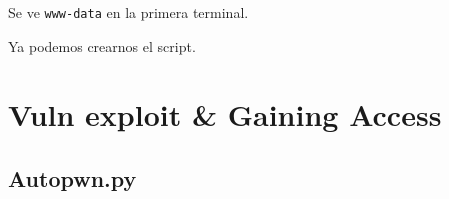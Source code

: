 \documentclass{assets/ipesethesis}
\begin{document}
Se ve \texttt{www-data} en la primera terminal.

Ya podemos crearnos el script.

\hypertarget{vuln-exploit-gaining-access-1}{%
\section*{Vuln exploit \& Gaining Access}\label{vuln-exploit-gaining-access-1}}

\hypertarget{autopwn.py}{%
\subsection*{Autopwn.py}\label{autopwn.py}}
\end{document}
